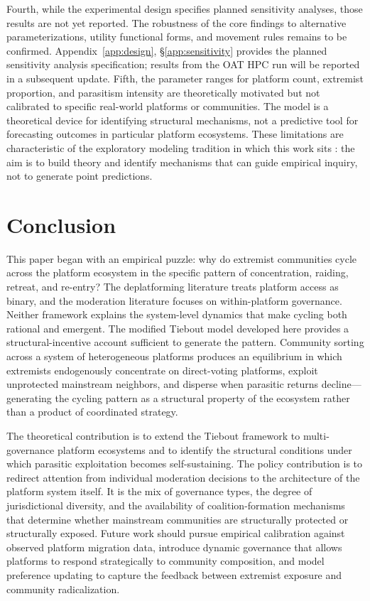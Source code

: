 \documentclass{article}
\begin{document}
Fourth, while the experimental design specifies planned sensitivity analyses, those results are not yet reported. The robustness of the core findings to alternative parameterizations, utility functional forms, and movement rules remains to be confirmed. Appendix~\ref{app:design}, \S\ref{app:sensitivity} provides the planned sensitivity analysis specification; results from the OAT HPC run will be reported in a subsequent update. Fifth, the parameter ranges for platform count, extremist proportion, and parasitism intensity are theoretically motivated but not calibrated to specific real-world platforms or communities. The model is a theoretical device for identifying structural mechanisms, not a predictive tool for forecasting outcomes in particular platform ecosystems. These limitations are characteristic of the exploratory modeling tradition in which this work sits \citep{bankesExploratoryModelingPolicy1993}: the aim is to build theory and identify mechanisms that can guide empirical inquiry, not to generate point predictions.

\section{Conclusion}
\label{sec:conclusion}

This paper began with an empirical puzzle: why do extremist communities cycle across the platform ecosystem in the specific pattern of concentration, raiding, retreat, and re-entry? The deplatforming literature treats platform access as binary, and the moderation literature focuses on within-platform governance. Neither framework explains the system-level dynamics that make cycling both rational and emergent. The modified Tiebout model developed here provides a structural-incentive account sufficient to generate the pattern. Community sorting across a system of heterogeneous platforms produces an equilibrium in which extremists endogenously concentrate on direct-voting platforms, exploit unprotected mainstream neighbors, and disperse when parasitic returns decline---generating the cycling pattern as a structural property of the ecosystem rather than a product of coordinated strategy.

The theoretical contribution is to extend the Tiebout framework to multi-governance platform ecosystems and to identify the structural conditions under which parasitic exploitation becomes self-sustaining. The policy contribution is to redirect attention from individual moderation decisions to the architecture of the platform system itself. It is the mix of governance types, the degree of jurisdictional diversity, and the availability of coalition-formation mechanisms that determine whether mainstream communities are structurally protected or structurally exposed. Future work should pursue empirical calibration against observed platform migration data, introduce dynamic governance that allows platforms to respond strategically to community composition, and model preference updating to capture the feedback between extremist exposure and community radicalization.
\end{document}
